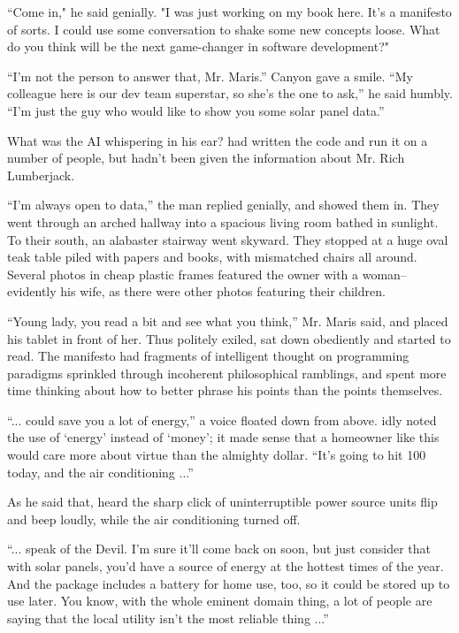 ``Come in," he said genially. "I was just working on my book here. It's a manifesto of sorts. I could use some conversation to shake some new concepts loose. What do you think will be the next game-changer in software development?"

``I'm not the person to answer that, Mr. Maris.'' Canyon gave a smile. ``My colleague here is our dev team superstar, so she's the one to ask,'' he said humbly. ``I'm just the guy who would like to show you some solar panel data.''

What was the AI whispering in his ear? {\protag} had written the code and run it on a number of people, but hadn't been given the information about Mr. Rich Lumberjack.

``I'm always open to data,'' the man replied genially, and showed them in. They went through an arched hallway into a spacious living room bathed in sunlight. To their south, an alabaster stairway went skyward. They stopped at a huge oval teak table piled with papers and books, with mismatched chairs all around. Several photos in cheap plastic frames featured the owner with a woman--evidently his wife, as there were other photos featuring their children.

``Young lady, you read a bit and see what you think,'' Mr. Maris said, and placed his tablet in front of her. Thus politely exiled, {\protag} sat down obediently and started to read. The manifesto had fragments of intelligent thought on programming paradigms sprinkled through incoherent philosophical ramblings, and {\protag} spent more time thinking about how to better phrase his points than the points themselves.

``... could save you a lot of energy,'' a voice floated down from above. {\protag} idly noted the use of `energy' instead of `money'; it made sense that a homeowner like this would care more about virtue than the almighty dollar. ``It's going to hit 100 today, and the air conditioning ...''

As he said that, {\protag} heard the sharp click of uninterruptible power source units flip and beep loudly, while the air conditioning turned off.

``... speak of the Devil. I'm sure it'll come back on soon, but just consider that with solar panels, you'd have a source of energy at the hottest times of the year. And the package includes a battery for home use, too, so it could be stored up to use later. You know, with the whole eminent domain thing, a lot of people are saying that the local utility isn't the most reliable thing ...''

